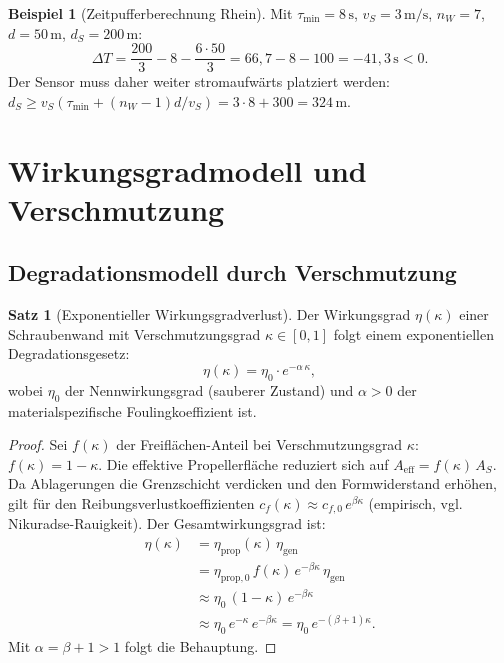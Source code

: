 ﻿\documentclass[a4paper,12pt]{article}
\theoremstyle{definition}
\newtheorem{beispiel}{Beispiel}
\newtheorem{satz}{Satz}
\begin{document}
\begin{beispiel}[Zeitpufferberechnung Rhein]
Mit $\tau_{\mathrm{min}} = 8\,\mathrm{s}$, $v_S = 3\,\mathrm{m/s}$, $n_W = 7$, $d = 50\,\mathrm{m}$,
$d_S = 200\,\mathrm{m}$:
\[
  \Delta T = \frac{200}{3} - 8 - \frac{6 \cdot 50}{3} = 66{,}7 - 8 - 100 = -41{,}3\,\mathrm{s} < 0.
\]
Der Sensor muss daher weiter stromaufwärts platziert werden: $d_S \geq v_S(\tau_{\mathrm{min}} + (n_W-1)d/v_S) = 3 \cdot 8 + 300 = 324\,\mathrm{m}$.
\end{beispiel}

\section{Wirkungsgradmodell und Verschmutzung}

\subsection{Degradationsmodell durch Verschmutzung}

\begin{satz}[Exponentieller Wirkungsgradverlust]
\label{satz:wirkungsgrad}
Der Wirkungsgrad $\eta(\kappa)$ einer Schraubenwand mit Verschmutzungsgrad
$\kappa \in [0, 1]$ folgt einem exponentiellen Degradationsgesetz:
\[
  \eta(\kappa) = \eta_0 \cdot e^{-\alpha\,\kappa},
\]
wobei $\eta_0$ der Nennwirkungsgrad (sauberer Zustand) und $\alpha > 0$ der
materialspezifische Foulingkoeffizient ist.
\end{satz}

\begin{proof}
Sei $f(\kappa)$ der Freiflächen-Anteil bei Verschmutzungsgrad $\kappa$:
$f(\kappa) = 1 - \kappa$. Die effektive Propellerfläche reduziert sich auf
$A_{\mathrm{eff}} = f(\kappa)\,A_S$. Da Ablagerungen die Grenzschicht verdicken
und den Formwiderstand erhöhen, gilt für den Reibungsverlustkoeffizienten
$c_f(\kappa) \approx c_{f,0}\,e^{\beta\kappa}$ (empirisch, vgl. Nikuradse-Rauigkeit).
Der Gesamtwirkungsgrad ist:
\begin{align*}
  \eta(\kappa) &= \eta_{\mathrm{prop}}(\kappa)\,\eta_{\mathrm{gen}} \\
               &= \eta_{\mathrm{prop},0}\,f(\kappa)\,e^{-\beta\kappa}\,\eta_{\mathrm{gen}} \\
               &\approx \eta_0\,(1-\kappa)\,e^{-\beta\kappa} \\
               &\approx \eta_0\,e^{-\kappa}\,e^{-\beta\kappa} = \eta_0\,e^{-(\beta+1)\kappa}.
\end{align*}
Mit $\alpha = \beta + 1 > 1$ folgt die Behauptung. \qedhere
\end{proof}
\end{document}
